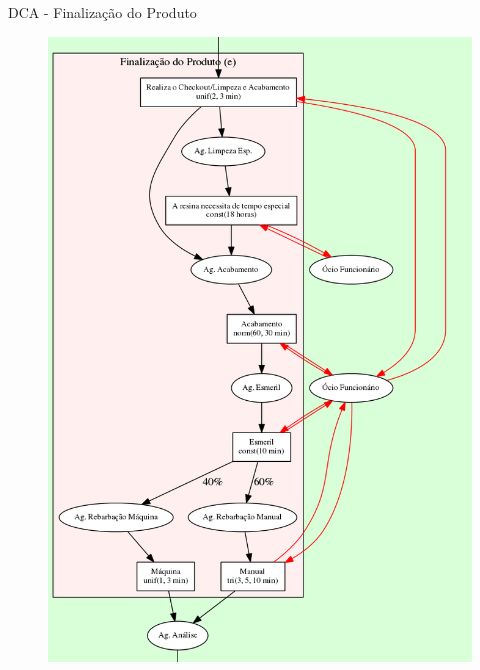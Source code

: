 \documentclass[xcolor=dvipsnames]{beamer}
\begin{document}
\begin{frame}{DCA - Finalização do Produto}
	\begin{figure}[H]
		\centering
		\includegraphics[height=0.865\textheight]{img/e.png}
	\end{figure}
\end{frame}
	
\end{document}
